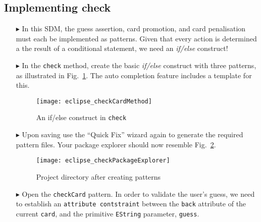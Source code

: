 \newpage
\hypertarget{checkCard tex}{}
\subsection{Implementing check}
\texHeader
 
\begin{itemize}
   
\item[$\blacktriangleright$] In this SDM, the guess assertion, card promotion, and card penalisation must each be implemented as patterns. Given that every
action is determined a the result of a conditional statement, we need an \emph{if/else} construct!

\item[$\blacktriangleright$] In the \texttt{check} method, create the basic \emph{if/else} construct with three patterns, as illustrated in
Fig.~\ref{fig:checkDec}. The auto completion feature includes a template for this.

\vspace{0.5cm}

\begin{figure}[htbp]
\begin{center}
  \texttt{[image: eclipse\_checkCardMethod]}
  \caption{An if/else construct in \texttt{check} \update}
  \label{fig:checkDec}
\end{center}
\end{figure} 

\item[$\blacktriangleright$] Upon saving use the ``Quick Fix'' wizard again to generate the required pattern files. Your package explorer should now resemble
Fig.~\ref{fig:checkPatternsExplorer}.

\begin{figure}[htbp]
\begin{center}
  \texttt{[image: eclipse\_checkPackageExplorer]}
  \caption{Project directory after creating patterns}
  \label{fig:checkPatternsExplorer}
\end{center}
\end{figure} 

\item[$\blacktriangleright$] Open the \texttt{checkCard} pattern. In order to validate the user's guess, we need to establish an \texttt{attribute contstraint}
between the \texttt{back} attribute of the current \texttt{card}, and the primitive \texttt{EString} parameter, \texttt{guess}. 


\end{itemize}
